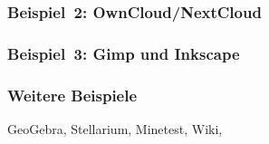 \documentclass{beamer}
\begin{document}
\begin{frame}
  \frametitle{Beispiel~2: OwnCloud/NextCloud}


\end{frame}

\begin{frame}
  \frametitle{Beispiel~3: Gimp und Inkscape}

\end{frame}

\begin{frame}
  \frametitle{Weitere Beispiele}

  GeoGebra, Stellarium, Minetest, Wiki,

\end{frame}
\end{document}
